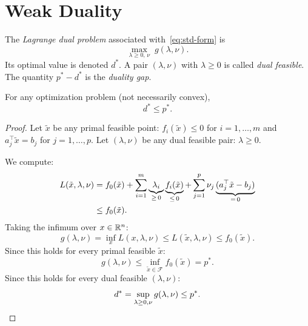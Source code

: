 \documentclass[11pt,a4paper]{article}
\begin{document}

\section{Weak Duality}\label{sec:weak-duality}

\begin{definition}\label{def:dual-problem}
The \emph{Lagrange dual problem} associated with~\eqref{eq:std-form} is
\begin{equation}\label{eq:dual-problem}
  \max_{\lambda \ge 0,\, \nu} \; g(\lambda, \nu).
\end{equation}
Its optimal value is denoted $d^*$. A pair $(\lambda, \nu)$ with
$\lambda \ge 0$ is called \emph{dual feasible}. The quantity $p^* - d^*$
is the \emph{duality gap}.
\end{definition}

\begin{theorem}\label{thm:weak-duality}
For any optimization problem (not necessarily convex),
\begin{equation}\label{eq:weak-duality}
  d^* \le p^*.
\end{equation}
\end{theorem}

\begin{proof}
Let $\tilde{x}$ be any primal feasible point: $f_i(\tilde{x}) \le 0$ for
$i = 1,\dots,m$ and $a_j^\top \tilde{x} = b_j$ for $j = 1,\dots,p$.
Let $(\lambda, \nu)$ be any dual feasible pair: $\lambda \ge 0$.

We compute:
\begin{align}
  L(\tilde{x}, \lambda, \nu)
  &= f_0(\tilde{x}) + \sum_{i=1}^m \underbrace{\lambda_i}_{\ge\, 0}
    \underbrace{f_i(\tilde{x})}_{\le\, 0}
    + \sum_{j=1}^p \nu_j \underbrace{(a_j^\top \tilde{x} - b_j)}_{=\, 0}
    \notag \\
  &\le f_0(\tilde{x}). \label{eq:wd-step1}
\end{align}
Taking the infimum over $x \in \mathbb{R}^n$:
\begin{equation}\label{eq:wd-step2}
  g(\lambda, \nu) = \inf_{x} L(x, \lambda, \nu) \le L(\tilde{x}, \lambda, \nu)
  \le f_0(\tilde{x}).
\end{equation}
Since this holds for every primal feasible $\tilde{x}$:
\begin{equation}\label{eq:wd-step3}
  g(\lambda, \nu) \le \inf_{\tilde{x} \in \mathcal{F}} f_0(\tilde{x}) = p^*.
\end{equation}
Since this holds for every dual feasible $(\lambda, \nu)$:
\begin{equation}\label{eq:wd-step4}
  d^* = \sup_{\lambda \ge 0, \nu} g(\lambda, \nu) \le p^*. \qedhere
\end{equation}
\end{proof}
\end{document}
